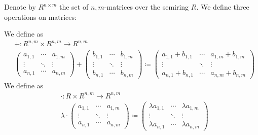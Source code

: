 \begin{definition}\label{def:algebra_of_matrices}
  Denote by \( R^{n \times m} \) the set of \( n, m \)-matrices over the semiring \( R \). We define three operations on matrices:

  \begin{description}
     We define  as
    \begin{align*}
      &+: R^{n,m} \times R^{n,m} \to R^{n,m} \\
      &\begin{pmatrix}
        a_{1,1} & \cdots & a_{1,m} \\
        \vdots  & \ddots & \vdots \\
        a_{n,1} & \cdots & a_{n,m}
      \end{pmatrix}
      +
      \begin{pmatrix}
        b_{1,1} & \cdots & b_{1,m} \\
        \vdots  & \ddots & \vdots \\
        b_{n,1} & \cdots & b_{n,m}
      \end{pmatrix}
      \coloneqq
      \begin{pmatrix}
        a_{1,1} + b_{1,1} & \cdots & a_{1,m} + b_{1,m} \\
        \vdots            & \ddots & \vdots \\
        a_{n,1} + b_{n,1} & \cdots & a_{n,m} + b_{n,m}
      \end{pmatrix}
    \end{align*}
     We define  as
    \begin{align*}
      &\cdot: R \times R^{n,m} \to R^{n,m} \\
      &\lambda \cdot \begin{pmatrix}
        a_{1,1} & \cdots & a_{1,m} \\
        \vdots  & \ddots & \vdots \\
        a_{n,1} & \cdots & a_{n,m}
      \end{pmatrix}
      \coloneqq
      \begin{pmatrix}
        \lambda a_{1,1} & \cdots & \lambda a_{1,m} \\
        \vdots          & \ddots & \vdots \\
        \lambda a_{n,1} & \cdots & \lambda a_{n,m}
      \end{pmatrix}
    \end{align*}


\end{description}
\end{definition}
